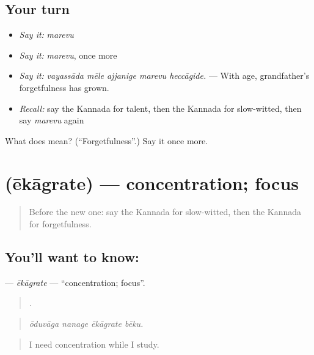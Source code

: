 \subsection*{Your turn}
\begin{itemize}
\raggedright
  \item \emph{Say it:} \emph{marevu}
  \item \emph{Say it:} \emph{marevu}, once more
  \item \emph{Say it:} \emph{vayassāda mēle ajjanige marevu heccāgide.} — With age, grandfather's forgetfulness has grown.
  \item \emph{Recall:} say the Kannada for talent, then the Kannada for slow-witted, then say \emph{marevu} again
\end{itemize}

\begin{tcolorbox}[breakable,colback=teal!4,colframe=teal!35!black,title={Before you move on}]
What does  mean? (\textquotedblleft{}Forgetfulness\textquotedblright{}.) Say it once more.
\end{tcolorbox}
\section[\texorpdfstring{\kn{ಏಕಾಗ್ರತೆ} (ēkāgrate)}{ಏಕಾಗ್ರತೆ (ēkāgrate)}]{ (ēkāgrate) — concentration; focus}

\label{lesson:KA-C503-ekagrate}



\begin{quote}
Before the new one: say the Kannada for slow-witted, then the Kannada for forgetfulness.
\end{quote}

\subsection*{You'll want to know: }
\textbf{} — \emph{ēkāgrate} — \textquotedblleft{}concentration; focus\textquotedblright{}.

\begin{quote}
   .
\end{quote}

\begin{quote}
\emph{ōduvāga nanage ēkāgrate bēku.}
\end{quote}

\begin{quote}
I need concentration while I study.
\end{quote}

